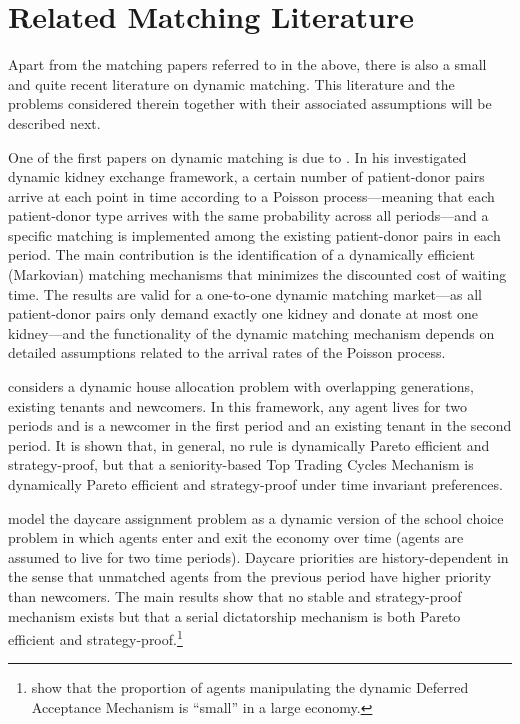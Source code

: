 \documentclass[12pt,fleqn]{article}
\begin{document}
\section{Related Matching Literature}\label{SEC:literature}
Apart from the matching papers referred to in the above, there is also a small and quite recent literature on dynamic matching. This literature and the problems considered therein together with their associated assumptions will be described next.

One of the first papers on dynamic matching is due to \citet{bib:Unver}. In his investigated dynamic kidney exchange framework, a certain number of patient-donor pairs arrive at each point in time according to a Poisson process---meaning that each patient-donor type arrives with the same probability across all periods---and a specific matching is implemented among the existing patient-donor pairs in each period. The main contribution is the identification of a dynamically efficient (Markovian) matching mechanisms that minimizes the discounted cost of waiting time. The results are valid for a one-to-one dynamic matching market---as all patient-donor pairs only demand exactly one kidney and donate at most one kidney---and the functionality of the dynamic matching mechanism depends on detailed assumptions related to the arrival rates of the Poisson process.

\citet{bib:Kurino} considers a dynamic house allocation problem with overlapping generations, existing tenants and newcomers. In this framework, any agent lives for two periods and is a newcomer in the first period and an existing tenant in the second period. It is shown that, in general, no rule is dynamically Pareto efficient and strategy-proof, but that a seniority-based Top Trading Cycles Mechanism is dynamically Pareto efficient and strategy-proof under time invariant preferences.

\citet{bib:KennesEtAl2014} model the daycare assignment problem as a dynamic version of the school choice problem in which agents enter and exit the economy over time (agents are assumed to live for two time periods). Daycare priorities are history-dependent in the sense that unmatched agents from the previous period have higher priority than newcomers. The main results show that no stable and strategy-proof mechanism exists but that a serial dictatorship mechanism is both Pareto efficient and strategy-proof.\footnote{\citet{bib:KennesEtAl2015} show that the proportion of agents manipulating the dynamic Deferred Acceptance Mechanism is ``small'' in a large economy.}
\end{document}
